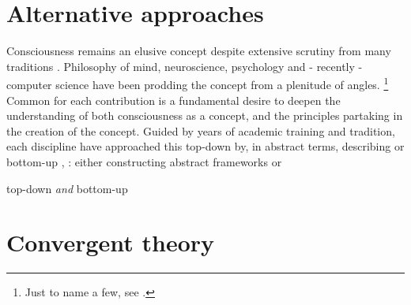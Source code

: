 \documentclass[a4paper,oneside]{memoir}
\begin{document}
\section{Alternative approaches}
Consciousness remains an elusive concept despite extensive scrutiny
from many traditions \autocite{sep-consciousness}. Philosophy of mind,
neuroscience, psychology and - recently - computer science have been
prodding the concept from a plenitude of angles.
\footnote{Just to name a few, see \autocite{block2007, sep-consciousness, schmidhuber2014,
Nilsson2009}.}
Common for each contribution is a fundamental desire to deepen the
understanding of both consciousness as a concept, and the principles
partaking in the creation of the concept. 
Guided by years of academic training and tradition, each discipline have
approached this \gls{top-down} by, in abstract terms, describing 
or \gls{bottom-up} \autocite{sep-consciousness},
: either constructing abstract
frameworks \autocite{block2007,kouider2010} or 

\gls{top-down} \textit{and} \gls{bottom-up} \autocite{dehaene2001, baars2005}
\section{Convergent theory}

\clearpage

\printglossaries

\printbibliography
\end{document}
